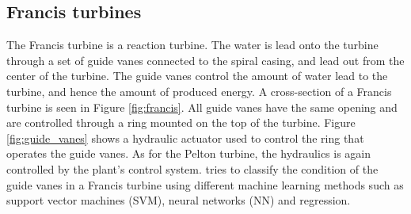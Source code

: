         
    
    \subsection{Francis turbines}\label{subsec:francis}
        The Francis turbine is a reaction turbine. The water is lead onto the turbine through a set of guide vanes connected to the spiral casing, and lead out from the center of the turbine. The guide vanes control the amount of water lead to the turbine, and hence the amount of produced energy. A cross-section of a Francis turbine is seen in Figure \ref{fig:francis}. All guide vanes have the same opening and are controlled through a ring mounted on the top of the turbine. Figure \ref{fig:guide_vanes} shows a hydraulic actuator used to control the ring that operates the guide vanes. As for the Pelton turbine, the hydraulics is again controlled by the plant's control system. \cite{Aasnes2017} tries to classify the condition of the guide vanes in a Francis turbine using different machine learning methods such as support vector machines (SVM), neural networks (NN) and regression.   
        
